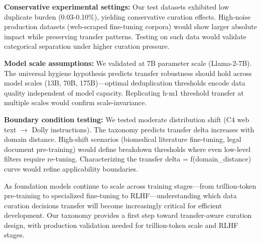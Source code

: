 \textbf{Conservative experimental settings:} Our test datasets exhibited low duplicate burden (0.03-0.10\%), yielding conservative curation effects. High-noise production datasets (web-scraped fine-tuning corpora) would show larger absolute impact while preserving transfer patterns. Testing on such data would validate categorical separation under higher curation pressure.

\textbf{Model scale assumptions:} We validated at 7B parameter scale (Llama-2-7B). The universal hygiene hypothesis predicts transfer robustness should hold across model scales (13B, 70B, 175B)---optimal deduplication thresholds encode data quality independent of model capacity. Replicating h-m1 threshold transfer at multiple scales would confirm scale-invariance.

\textbf{Boundary condition testing:} We tested moderate distribution shift (C4 web text $\rightarrow$ Dolly instructions). The taxonomy predicts transfer delta increases with domain distance. High-shift scenarios (biomedical literature fine-tuning, legal document pre-training) would define breakdown thresholds where even low-level filters require re-tuning. Characterizing the transfer delta = f(domain\_distance) curve would refine applicability boundaries.

As foundation models continue to scale across training stages---from trillion-token pre-training to specialized fine-tuning to RLHF---understanding which data curation decisions transfer will become increasingly critical for efficient development. Our taxonomy provides a first step toward transfer-aware curation design, with production validation needed for trillion-token scale and RLHF stages.
